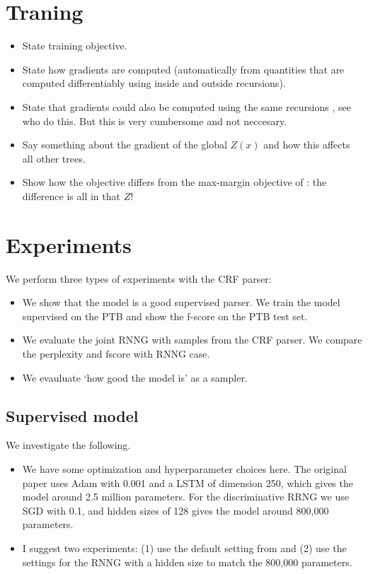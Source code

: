 \section{Traning}
\begin{itemize}
  \item State training objective.
  \item State how gradients are computed (automatically from quantities that are computed differentiably using inside and outside recursions).
  \item State that gradients could also be computed using the same recursions \citep{eisner2009semirings}, see \citet{kim2017structured} who do this. But this is very cumbersome and not neccesary.
  \item Say something about the gradient of the global $Z(x)$ and how this affects all other trees.
  \item Show how the objective differs from the max-margin objective of \citep{stern2017minimal}: the difference is all in that $Z$!
\end{itemize}

\section{Experiments}
  We perform three types of experiments with the CRF parser:
  \begin{itemize}
    \item We show that the model is a good supervised parser. We train the model supervised on the PTB and show the f-score on the PTB test set.
    \item We evaluate the joint RNNG with samples from the CRF parser. We compare the perplexity and fscore with RNNG case.
    \item We evauluate `how good the model is' as a sampler.
  \end{itemize}

\subsection{Supervised model}
  We investigate the following.
  \begin{itemize}
    \item We have some optimization and hyperparameter choices here. The original paper uses Adam with 0.001 and a LSTM of dimension 250, which gives the model around 2.5 million parameters. For the discriminative RRNG we use SGD with 0.1, and hidden sizes of 128 gives the model around 800,000 parameters.
    \item I suggest two experiments: (1) use the default setting from \citep{stern2017minimal} and (2) use the settings for the RNNG with a hidden size to match the 800,000 parameters.
  \end{itemize}

